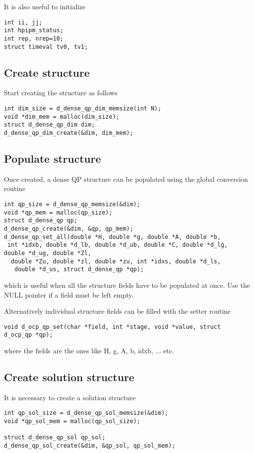 \documentclass[a4paper]{article}
\begin{document}
It is also useful to initialize 
\begin{verbatim}
int ii, jj;
int hpipm_status;
int rep, nrep=10;
struct timeval tv0, tv1;
\end{verbatim}

\subsection{Create structure}
Start creating the structure as follows 
\begin{verbatim}
int dim_size = d_dense_qp_dim_memsize(int N);
void *dim_mem = malloc(dim_size);
struct d_dense_qp_dim dim;
d_dense_qp_dim_create(&dim, dim_mem);
\end{verbatim}

\subsection{Populate structure}
Once created, a dense QP structure can be populated using the global conversion routine
\begin{verbatim}
int qp_size = d_dense_qp_memsize(&dim);
void *qp_mem = malloc(qp_size);
struct d_dense_qp qp;
d_dense_qp_create(&dim, &qp, qp_mem);
d_dense_qp_set_all(double *H, double *g, double *A, double *b,
 int *idxb, double *d_lb, double *d_ub, double *C, double *d_lg, double *d_ug, double *Zl,
  double *Zu, double *zl, double *zu, int *idxs, double *d_ls,
   double *d_us, struct d_dense_qp *qp);

\end{verbatim}

which is useful when all the structure fields have to be populated at once. Use the NULL pointer if a field must be left empty.

Alternatively individual structure fields can be filled with the setter routine 
\begin{verbatim}
void d_ocp_qp_set(char *field, int *stage, void *value, struct d_ocp_qp *qp);
\end{verbatim}
where the fields are the ones like H, g, A, b,
idxb, ... etc.
\subsection{Create solution structure}
It is necessary to create a solution structure

\begin{verbatim}
int qp_sol_size = d_dense_qp_sol_memsize(&dim);
void *qp_sol_mem = malloc(qp_sol_size);

struct d_dense_qp_sol qp_sol;
d_dense_qp_sol_create(&dim, &qp_sol, qp_sol_mem);
\end{verbatim}
\end{document}
